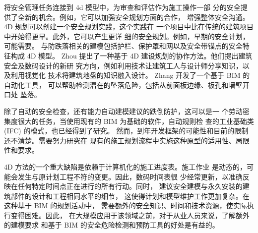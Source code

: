 将安全管理任务连接到 4d 模型中，为审查和评估作为施工操作一部
分的安全提供了全新的机会。例如，它可以加强安全规划方面的合作，
增强整体安全沟通。4D 规划可以创建一个安全规划实践，这个实践在
一个项目中比在传统的建筑项目中开始得更早。此外，它可以产生更详
细的安全规划。例如，早期的安全计划，可能需要。
与防跌落相关的建模包括护栏、保护罩和网以及安全带锚点的安全特征构成 4D 模型。
Zhou 提出了一种基于 4D 建设规划的协作方法。他们提出建筑安全及数码设计的新研
究方向，例如利用技术让建筑工人与设计师分享知识，以及利用视觉化
技术将建筑地盘的知识融入设计。 Zhang 开发了一个基于 BIM 的自动化工具，
可以帮助检测潜在的坠落危险，包括从前面板边缘、板孔和墙壁开口处
坠落。

除了自动的安全检查，还有能力自动建模建议的跌倒防护，这可以是一
个劳动密集度很大的任务，当使用现有的 BIM 为基础的软件，自动规则检
查的工业基础类 (IFC) 的模式，也已经得到了研究。
然而，到年开发框架的可能性和目前的限制还不清楚。需要努力研究在
现有的施工规划流程中实施这种原型的适用性、局限性和要求。

4D 方法的一个重大缺陷是依赖于计算机化的施工进度表。施工作业
是动态的，可能会发生与原计划工程不符的变更。因此，数码时间表很
少经常更新，以准确反映在任何特定时间点正在进行的所有行动。同时，
建议安全建模与永久安装的建筑部件的设计和工程相同水平的细节，
这使得计划和模型维护工作更加复杂。在这种基于 BIM 的规划活动中，
需要额外的安全知识、时间和技术资源，使实际执行变得困难。因此，
在大规模应用于该领域之前，对于从业人员来说，了解额外的建模要求
和基于 BIM 的安全危险检测和预防工具的好处是有益的。
